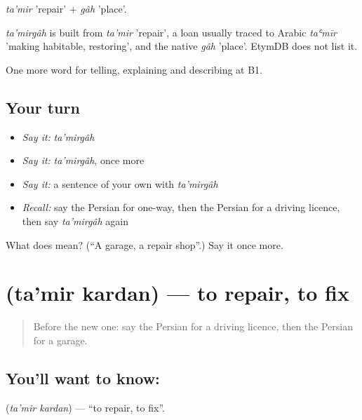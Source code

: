 \emph{ta'mir} 'repair' + \emph{gâh} 'place'.

\begin{cousinweb}
\emph{ta'mirgâh} is built from \emph{ta'mir} 'repair', a loan usually traced to Arabic \emph{taʿmīr} 'making habitable, restoring', and the native \emph{gâh} 'place'. EtymDB does not list it.
\end{cousinweb}

\begin{grammarlens}[title={What you've built}]
One more word for telling, explaining and describing at B1.
\end{grammarlens}

\subsection*{Your turn}
\begin{itemize}
\raggedright
  \item \emph{Say it:} \emph{ta'mirgâh}
  \item \emph{Say it:} \emph{ta'mirgâh}, once more
  \item \emph{Say it:} a sentence of your own with \emph{ta'mirgâh}
  \item \emph{Recall:} say the Persian for one-way, then the Persian for a driving licence, then say \emph{ta'mirgâh} again
\end{itemize}

\begin{tcolorbox}[breakable,colback=teal!4,colframe=teal!35!black,title={Before you move on}]
What does  mean? (\textquotedblleft{}A garage, a repair shop\textquotedblright{}.) Say it once more.
\end{tcolorbox}
\section[\texorpdfstring{\fa{تعمیر} \fa{کردن} (ta'mir kardan)}{تعمیر کردن (ta'mir kardan)}]{  (ta'mir kardan) — to repair, to fix}

\label{lesson:FA-C427-tamir-kardan}



\begin{quote}
Before the new one: say the Persian for a driving licence, then the Persian for a garage.
\end{quote}

\subsection*{You'll want to know:  }
\textbf{ } (\emph{ta'mir kardan}) — \textquotedblleft{}to repair, to fix\textquotedblright{}.

